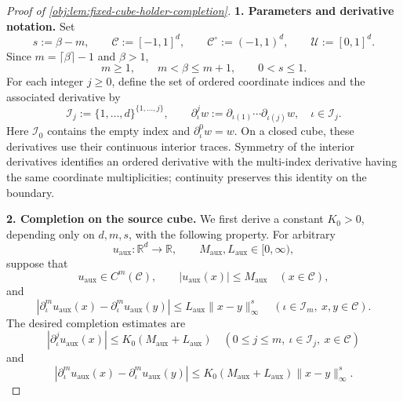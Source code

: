\documentclass[11pt]{article}
\begin{document}
\begin{proof}[Proof of \cref{obj:lem:fixed-cube-holder-completion}]
\textbf{1. Parameters and derivative notation.}
Set
\[
s:=\beta-m,\qquad
\mathscr C:=[-1,1]^d,\qquad
\mathscr C^\circ:=(-1,1)^d,\qquad
\mathscr U:=[0,1]^d.
\]
Since \(m=\lceil\beta\rceil-1\) and \(\beta>1\),
\[
m\ge1,\qquad
m<\beta\le m+1,\qquad
0<s\le1.
\]
For each integer \(j\ge0\), define the set of ordered coordinate indices and the associated derivative by
\[
\mathscr I_j:=\{1,\ldots,d\}^{\{1,\ldots,j\}},
\qquad
\partial_\iota^j w
:=
\partial_{\iota(1)}\cdots\partial_{\iota(j)}w,
\quad \iota\in\mathscr I_j.
\]
Here \(\mathscr I_0\) contains the empty index and
\(\partial_\iota^0w=w\). On a closed cube, these derivatives use their continuous interior traces. Symmetry of the interior derivatives identifies an ordered derivative with the multi-index derivative having the same coordinate multiplicities; continuity preserves this identity on the boundary.

\textbf{2. Completion on the source cube.}
We first derive a constant \(K_0>0\), depending only on \(d,m,s\), with the following property. For arbitrary
\[
u_{\mathrm{aux}}:\mathbb R^d\to\mathbb R,
\qquad
M_{\mathrm{aux}},L_{\mathrm{aux}}\in[0,\infty),
\]
suppose that
\[
u_{\mathrm{aux}}\in C^m(\mathscr C),\qquad
|u_{\mathrm{aux}}(x)|\le M_{\mathrm{aux}}
\quad(x\in\mathscr C),
\]
and
\[
|\partial_\iota^m u_{\mathrm{aux}}(x)
-\partial_\iota^m u_{\mathrm{aux}}(y)|
\le L_{\mathrm{aux}}\|x-y\|_\infty^s
\quad(\iota\in\mathscr I_m,\ x,y\in\mathscr C).
\]
The desired completion estimates are
\[
|\partial_\iota^j u_{\mathrm{aux}}(x)|
\le K_0(M_{\mathrm{aux}}+L_{\mathrm{aux}})
\quad(0\le j\le m,\ \iota\in\mathscr I_j,\ x\in\mathscr C)
\]
and
\[
|\partial_\iota^m u_{\mathrm{aux}}(x)
-\partial_\iota^m u_{\mathrm{aux}}(y)|
\le K_0(M_{\mathrm{aux}}+L_{\mathrm{aux}})
\|x-y\|_\infty^s.
\]


\end{proof}
\end{document}
